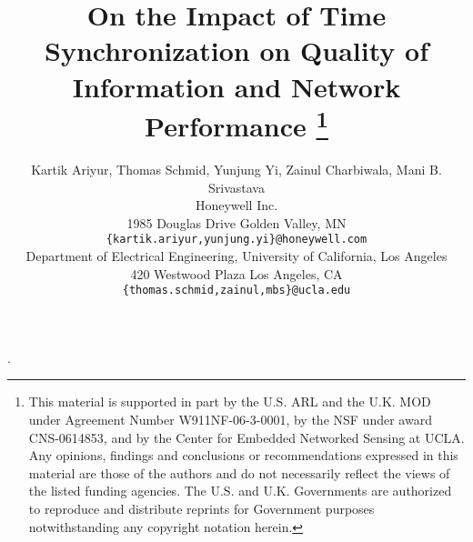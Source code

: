 \documentclass[conference]{IEEEtran}
\begin{document}
\title{On the Impact of Time Synchronization on Quality of Information and Network Performance
\thanks{This material is supported in part by the U.S. ARL and the
U.K. MOD under Agreement Number W911NF-06-3-0001, by the NSF under
award CNS-0614853, and by the Center for Embedded Networked Sensing
at UCLA. Any opinions, findings and conclusions or recommendations
expressed in this material are those of the authors and do not
necessarily reflect the views of the listed funding agencies. The
U.S. and U.K. Governments are authorized to reproduce and distribute
reprints for Government purposes notwithstanding any copyright
notation herein.}}
\author{{\sc Kartik Ariyur\dag}, {\sc Thomas Schmid\ddag}, {\sc Yunjung Yi\dag}, {\sc Zainul Charbiwala\ddag}, {\sc Mani B. Srivastava\ddag}\\
\normalsize{\dag Honeywell Inc.} \\
\normalsize{1985 Douglas Drive Golden Valley, MN}\\
\normalsize{\tt\{kartik.ariyur,yunjung.yi\}@honeywell.com}\\
\normalsize{\ddag Department of Electrical Engineering, }
\normalsize{University of California, Los Angeles} \\
\normalsize{420 Westwood Plaza Los Angeles, CA}\\
\normalsize{\tt\{thomas.schmid,zainul,mbs\}@ucla.edu} }

\maketitle
\newtheorem{theorem}{Theorem}
\newtheorem{assumption}{Assumption}
.\normalbaselineskip


%
%
%


%
%



\end{document}
